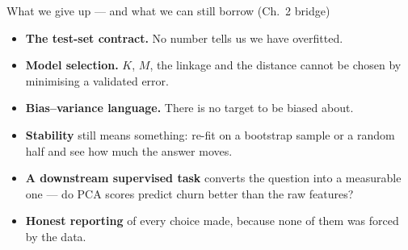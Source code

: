 \documentclass[aspectratio=169,11pt]{beamer}
\begin{document}
\begin{frame}{What we give up --- and what we can still borrow (Ch.\ 2 bridge)}
  \footnotesize
  \begin{readme}
    \begin{itemize}
      \item \textbf{The test-set contract.} No number tells us we have overfitted.
      \item \textbf{Model selection.} $K$, $M$, the linkage and the distance cannot be
            chosen by minimising a validated error.
      \item \textbf{Bias--variance language.} There is no target to be biased about.
    \end{itemize}
  \end{readme}
  \begin{takeaway}
    \begin{itemize}
      \item \textbf{Stability} still means something: re-fit on a bootstrap sample or a
            random half and see how much the answer moves.
      \item \textbf{A downstream supervised task} converts the question into a measurable
            one --- do PCA scores predict churn better than the raw features?
      \item \textbf{Honest reporting} of every choice made, because none of them was forced
            by the data.
    \end{itemize}
  \end{takeaway}
\end{frame}
\end{document}
